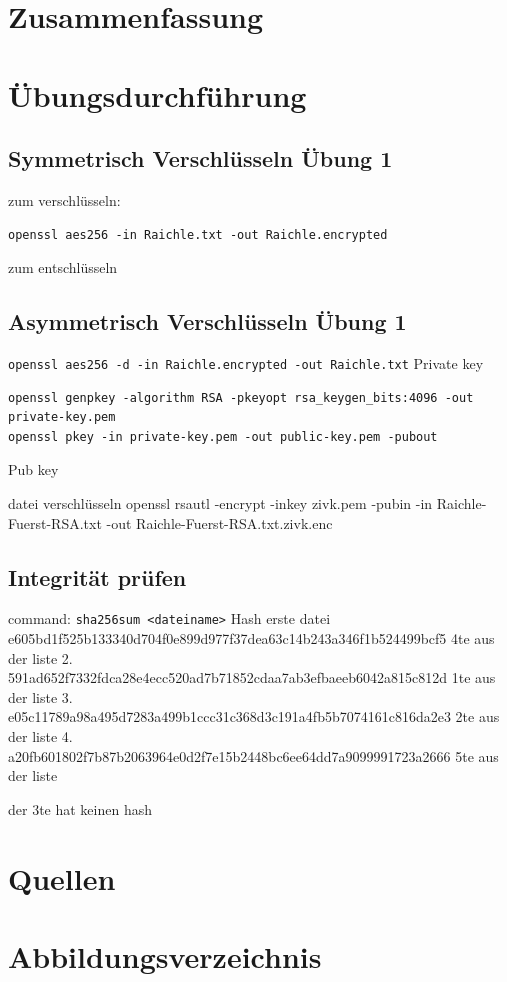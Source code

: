 \documentclass[a4paper]{article}
\begin{document}
\section{Zusammenfassung}


\newpage

\section{Übungsdurchführung}

\subsection{Symmetrisch Verschlüsseln Übung 1}
zum verschlüsseln:
\begin{lstlisting}
openssl aes256 -in Raichle.txt -out Raichle.encrypted
\end{lstlisting}
zum entschlüsseln

\subsection{Asymmetrisch Verschlüsseln Übung 1}
\texttt{openssl aes256 -d -in Raichle.encrypted -out Raichle.txt}
Private key
\begin{lstlisting}
openssl genpkey -algorithm RSA -pkeyopt rsa_keygen_bits:4096 -out private-key.pem
openssl pkey -in private-key.pem -out public-key.pem -pubout
\end{lstlisting}
Pub key

datei verschlüsseln
openssl rsautl -encrypt -inkey zivk.pem -pubin -in Raichle-Fuerst-RSA.txt -out Raichle-Fuerst-RSA.txt.zivk.enc
\subsection{Integrität prüfen}
command:
\texttt{sha256sum <dateiname>}
Hash erste datei
e605bd1f525b133340d704f0e899d977f37dea63c14b243a346f1b524499bcf5
4te aus der liste
2.
591ad652f7332fdca28e4ecc520ad7b71852cdaa7ab3efbaeeb6042a815c812d
1te aus der liste
3.
e05c11789a98a495d7283a499b1ccc31c368d3c191a4fb5b7074161c816da2e3
2te aus der liste
4.
a20fb601802f7b87b2063964e0d2f7e15b2448bc6ee64dd7a9099991723a2666
5te aus der liste

der 3te hat keinen hash



\newpage
\section{Quellen}

\newpage
\section{Abbildungsverzeichnis}

\listoffigures
\end{document}
